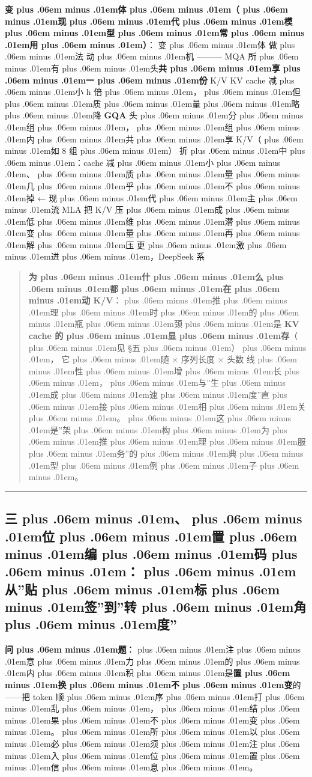 \documentclass[
]{article}
\newcommand{\passthrough}[1]{#1}
\def\zh#1{{\zhfont #1}}
\def\sym#1{{\symfont #1}}
\def\codezh#1{{\zhmonofont #1}}
\def\zhglue{\hskip0pt plus .06em minus .01em}
\begin{document}
\textbf{\zh{变\zhglue 体\zhglue （\zhglue 现\zhglue 代\zhglue 模\zhglue 型\zhglue 常\zhglue 用\zhglue ）}}\zh{：} \textbar{} \zh{变\zhglue 体} \textbar{} \zh{做\zhglue 法} \textbar{} \zh{动\zhglue 机} \textbar{} \textbar---\textbar---\textbar---\textbar{} \textbar{} MQA \textbar{} \zh{所\zhglue 有\zhglue 头}\textbf{\zh{共\zhglue 享\zhglue 一\zhglue 份}} K/V \textbar{} KV cache \zh{减\zhglue 小} h \zh{倍\zhglue ，\zhglue 但\zhglue 质\zhglue 量\zhglue 略\zhglue 降} \textbar{} \textbar{} \textbf{GQA} \textbar{} \zh{头\zhglue 分\zhglue 组\zhglue ，\zhglue 组\zhglue 内\zhglue 共\zhglue 享} K/V\zh{（\zhglue 如} 8 \zh{组\zhglue ）} \textbar{} \zh{折\zhglue 中\zhglue ：}cache \zh{减\zhglue 小\zhglue 、\zhglue 质\zhglue 量\zhglue 几\zhglue 乎\zhglue 不\zhglue 掉} \sym{←} \zh{现\zhglue 代\zhglue 主\zhglue 流} \textbar{} \textbar{} MLA \textbar{} \zh{把} K/V \zh{压\zhglue 成\zhglue 低\zhglue 维\zhglue 潜\zhglue 变\zhglue 量\zhglue 再\zhglue 解\zhglue 压} \textbar{} \zh{更\zhglue 激\zhglue 进\zhglue ，}DeepSeek \zh{系} \textbar{}

\begin{quote}
\textbf{\zh{为\zhglue 什\zhglue 么\zhglue 都\zhglue 在\zhglue 动} K/V}\zh{：\zhglue 推\zhglue 理\zhglue 时\zhglue 的\zhglue 瓶\zhglue 颈\zhglue 是} \textbf{KV cache \zh{的\zhglue 显\zhglue 存}}\zh{（\zhglue 见} \sym{§}\zh{五\zhglue ）\zhglue ，} \zh{它\zhglue 随} \passthrough{\codezh{{\zh{层}}{\zh{数}} {\sym{×}} {\zh{序}}{\zh{列}}{\zh{长}}{\zh{度}} {\sym{×}} {\zh{头}}{\zh{数}}}} \zh{线\zhglue 性\zhglue 增\zhglue 长\zhglue ，\zhglue 与}''\zh{生\zhglue 成\zhglue 速\zhglue 度}''\zh{直\zhglue 接\zhglue 相\zhglue 关\zhglue 。\zhglue 这\zhglue 是}''\zh{架\zhglue 构\zhglue 为\zhglue 推\zhglue 理\zhglue 服\zhglue 务}''\zh{的\zhglue 典\zhglue 型\zhglue 例\zhglue 子\zhglue 。}
\end{quote}

\begin{center}\rule{0.5\linewidth}{0.5pt}\end{center}

\subsection{\zh{三\zhglue 、\zhglue 位\zhglue 置\zhglue 编\zhglue 码\zhglue ：\zhglue 从}''\zh{贴\zhglue 标\zhglue 签}''\zh{到}''\zh{转\zhglue 角\zhglue 度}''}\label{ux4e09ux4f4dux7f6eux7f16ux7801ux4eceux8d34ux6807ux7b7eux5230ux8f6cux89d2ux5ea6}

\textbf{\zh{问\zhglue 题}}\zh{：\zhglue 注\zhglue 意\zhglue 力\zhglue 的\zhglue 内\zhglue 积\zhglue 是}\textbf{\zh{置\zhglue 换\zhglue 不\zhglue 变}}\zh{的}------\zh{把} token \zh{顺\zhglue 序\zhglue 打\zhglue 乱\zhglue ，\zhglue 结\zhglue 果\zhglue 不\zhglue 变\zhglue 。\zhglue 所\zhglue 以\zhglue 必\zhglue 须\zhglue 注\zhglue 入\zhglue 位\zhglue 置\zhglue 信\zhglue 息\zhglue 。}
\end{document}
